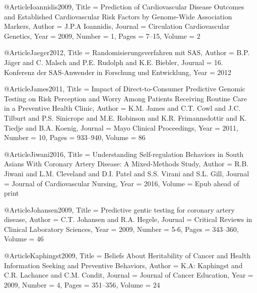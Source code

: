 @Article{Ioannidis2009,
  Title                    = {Prediction of Cardiovascular Disease Outcomes and Established Cardiovascular Risk Factors by Genome-Wide Association Markers},
  Author                   = {J.P.A Ioannidis},
  Journal                  = {Circulation Cardiovascular Genetics},
  Year                     = {2009},
  Number                   = {1},
  Pages                    = {7--15},
  Volume                   = {2}
}

@Article{Jaeger2012,
  Title                    = {Randomisierungsverfahren mit SAS},
  Author                   = {B.P. Jäger and C. Malsch and P.E. Rudolph and K.E. Biebler},
  Journal                  = {16. Konferenz der SAS-Anwender in Forschung und Entwicklung},
  Year                     = {2012}
}

@Article{James2011,
  Title                    = {Impact of Direct-to-Consumer Predictive Genomic Testing on Risk Perception and Worry Among Patients Receiving Routine Care in a Preventive Health Clinic},
  Author                   = {K.M. James and C.T. Cowl and J.C. Tilburt and P.S. Sinicrope and M.E. Robinson and K.R. Frimannsdottir and K. Tiedje and B.A. Koenig},
  Journal                  = {Mayo Clinical Proceedings},
  Year                     = {2011},
  Number                   = {10},
  Pages                    = {933--940},
  Volume                   = {86}
}

@Article{Jiwani2016,
  Title                    = {Understanding Self-regulation Behaviors in South Asians With Coronary Artery Disease: A Mixed-Methods Study},
  Author                   = {R.B. Jiwani and L.M. Cleveland and D.I. Patel and S.S. Virani and S.L. Gill},
  Journal                  = {Journal of Cardiovascular Nursing},
  Year                     = {2016},
  Volume                   = {Epub ahead of print}
}

@Article{Johansen2009,
  Title                    = {Predictive gentic testing for coronary artery disease},
  Author                   = {C.T. Johansen and R.A. Hegele},
  Journal                  = {Critical Reviews in Clinical Laboratory Sciences},
  Year                     = {2009},
  Number                   = {5-6},
  Pages                    = {343--360},
  Volume                   = {46}
}

@Article{Kaphingst2009,
  Title                    = {Beliefs About Heritability of Cancer and Health Information Seeking and Preventive Behaviors},
  Author                   = {K.A: Kaphingst and C.R. Lachance and C.M. Condit},
  Journal                  = {Journal of Cancer Education},
  Year                     = {2009},
  Number                   = {4},
  Pages                    = {351--356},
  Volume                   = {24}
}


